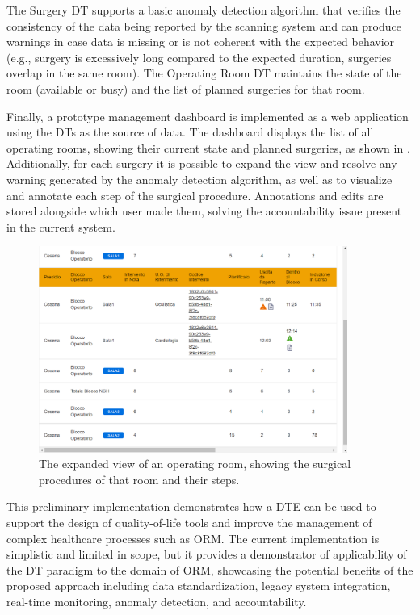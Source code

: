 The Surgery \ac{DT} supports a basic anomaly detection algorithm that verifies the consistency of the data being reported by the scanning system and can produce warnings in case data is missing or is not coherent with the expected behavior (e.g., surgery is excessively long compared to the expected duration, surgeries overlap in the same room).
%
The Operating Room \ac{DT} maintains the state of the room (available or busy) and the list of planned surgeries for that room.

Finally, a prototype management dashboard is implemented as a web application using the \acp{DT} as the source of data.
%
The dashboard displays the list of all operating rooms, showing their current state and planned surgeries, as shown in .
%
Additionally, for each surgery it is possible to expand the view and resolve any warning generated by the anomaly detection algorithm, as well as to visualize and annotate each step of the surgical procedure.
%
Annotations and edits are stored alongside which user made them, solving the accountability issue present in the current system. 

\begin{figure}
    \centering
    \includegraphics[width=0.9\textwidth]{figures/orm/interventi.png}
     \caption{The expanded view of an operating room, showing the surgical procedures of that room and their steps.}
    \label{fig:orm:surgical_procedures_dashboard}
\end{figure}


This preliminary implementation demonstrates how a \ac{DTE} can be used to support the design of quality-of-life tools and improve the management of complex healthcare processes such as ORM.
%
The current implementation is simplistic and limited in scope, but it provides a demonstrator of applicability of the \ac{DT} paradigm to the domain of ORM, showcasing the potential benefits of the proposed approach including data standardization, legacy system integration, real-time monitoring, anomaly detection, and accountability.

